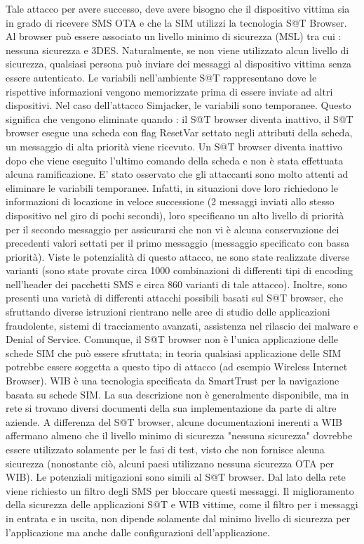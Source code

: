 Tale attacco per avere successo, deve avere bisogno che il dispositivo vittima sia in grado di ricevere SMS OTA e che la SIM utilizzi la tecnologia S@T Browser. Al browser può essere associato un livello minimo di sicurezza (MSL) tra cui : nessuna sicurezza e 3DES. Naturalmente, se non viene utilizzato alcun livello di sicurezza, qualsiasi persona può inviare dei messaggi al dispositivo vittima senza essere autenticato. Le variabili nell'ambiente S@T rappresentano dove le rispettive informazioni vengono memorizzate prima di essere inviate ad altri dispositivi. Nel caso dell'attacco Simjacker, le variabili sono temporanee. Questo significa che vengono eliminate quando : il S@T browser diventa inattivo, il S@T browser esegue una scheda con flag ResetVar settato negli attributi della scheda, un messaggio di alta priorità viene ricevuto. Un S@T browser diventa inattivo dopo che viene eseguito l'ultimo comando della scheda e non è stata effettuata alcuna ramificazione. E' stato osservato che gli attaccanti sono molto attenti ad eliminare le variabili temporanee. Infatti, in situazioni dove loro richiedono le informazioni di locazione in veloce successione (2 messaggi inviati allo stesso dispositivo nel giro di pochi secondi), loro specificano un alto livello di priorità per il secondo messaggio per assicurarsi che non vi è alcuna conservazione dei precedenti valori settati per il primo messaggio (messaggio specificato con bassa priorità). Viste le potenzialità di questo attacco, ne sono state realizzate diverse varianti (sono state provate circa 1000 combinazioni di differenti tipi di encoding nell'header dei pacchetti SMS e circa 860 varianti di tale attacco). Inoltre, sono presenti una varietà di differenti attacchi possibili basati sul S@T browser, che sfruttando diverse istruzioni rientrano nelle aree di studio delle applicazioni fraudolente, sistemi di tracciamento avanzati, assistenza nel rilascio dei malware e Denial of Service. Comunque, il S@T browser non è l'unica applicazione delle schede SIM che può essere sfruttata; in teoria qualsiasi applicazione delle SIM potrebbe essere soggetta a questo tipo di attacco (ad esempio Wireless Internet Browser). WIB è una tecnologia specificata da SmartTrust per la navigazione basata su schede SIM. La sua descrizione non è generalmente disponibile, ma in rete si trovano diversi documenti della sua implementazione da parte di altre aziende. A differenza del S@T browser, alcune documentazioni inerenti a WIB affermano almeno che il livello minimo di sicurezza "nessuna sicurezza" dovrebbe essere utilizzato solamente per le fasi di test, visto che non fornisce alcuna sicurezza (nonostante ciò, alcuni paesi utilizzano nessuna sicurezza OTA per WIB). Le potenziali mitigazioni sono simili al S@T browser. Dal lato della rete viene richiesto un filtro degli SMS per bloccare questi messaggi. Il miglioramento della sicurezza delle applicazioni S@T e WIB vittime, come il filtro per i messaggi in entrata e in uscita, non dipende solamente dal minimo livello di sicurezza per l'applicazione ma anche dalle configurazioni dell'applicazione.
